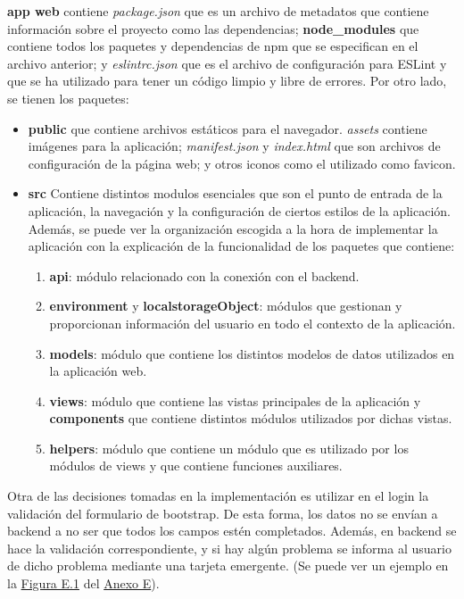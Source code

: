 \textbf{app web} contiene \textit{package.json} que es un archivo de metadatos que contiene información sobre el proyecto como las dependencias; \textbf{node\_modules} que contiene todos los paquetes y dependencias de npm que se especifican en el archivo anterior; y \textit{eslintrc.json} que es el archivo de configuración para ESLint y que se ha utilizado para tener un código limpio y libre de errores. Por otro lado, se tienen los paquetes:
\begin{itemize}
	\item \textbf{public} que contiene archivos estáticos para el navegador. \textit{assets} contiene imágenes para la aplicación; \textit{manifest.json} y \textit{index.html} que son archivos de configuración de la página web; y otros iconos como el utilizado como favicon.
	\item \textbf{src} Contiene distintos modulos esenciales que son el punto de entrada de la aplicación, la navegación y la configuración de ciertos estilos de la aplicación. Además, se puede ver la organización escogida a la hora de implementar la aplicación con la explicación de la funcionalidad de los paquetes que contiene:
	\begin{enumerate}
		\item \textbf{api}: módulo relacionado con la conexión con el backend.
		\item \textbf{environment} y \textbf{localstorageObject}: módulos que gestionan y proporcionan información del usuario en todo el contexto de la aplicación.
		\item \textbf{models}: módulo que contiene los distintos modelos de datos utilizados en la aplicación web.
		\item \textbf{views}: módulo que contiene las vistas principales de la aplicación y \textbf{components} que contiene distintos módulos utilizados por dichas vistas.
		\item \textbf{helpers}: módulo que contiene un módulo que es utilizado por los módulos de views y que contiene funciones auxiliares.
	\end{enumerate}
\end{itemize}


Otra de las decisiones tomadas en la implementación es utilizar en el login la validación del formulario de bootstrap. De esta forma, los datos no se envían a backend a no ser que todos los campos estén completados. Además, en backend se hace la validación correspondiente, y si hay algún problema se informa al usuario de dicho problema mediante una tarjeta emergente. (Se puede ver un ejemplo en la \hyperref[fig:login-error]{Figura E.1} del \hyperref[anexo-e]{Anexo E}).\\

